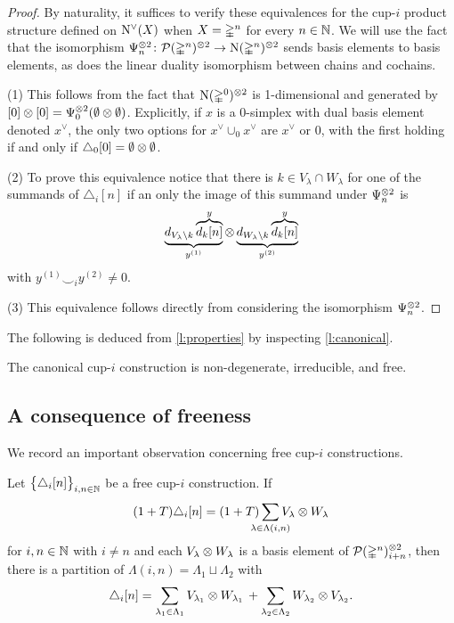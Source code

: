\begin{proof}
	By naturality, it suffices to verify these equivalences for the \mbox{cup-$i$} product structure defined on $\operatorname{N^{\vee}}(X)$ when $X = \mathbb{\Delta}^n$ for every $n \in \mathbb{N}$.
	We will use the fact that the isomorphism $\Psi_n^{\otimes 2} \colon \mathcal{P}(\mathbb{\Delta}^n)^{\otimes 2} \to \operatorname{N}(\mathbb{\Delta}^n)^{\otimes 2}$ sends basis elements to basis elements, as does the linear duality isomorphism between chains and cochains.

	\noindent (1) This follows from the fact that $\operatorname{N}(\mathbb{\Delta}^0)^{\otimes 2}$ is 1-dimensional and generated by $[0] \otimes [0] = \Psi_0^{\otimes 2} (\emptyset \otimes \emptyset)$.
	Explicitly, if $x$ is a $0$-simplex with dual basis element denoted $x^\vee$, the only two options for $x^\vee \cup_0 x^\vee$ are $x^\vee$ or $0$, with the first holding if and only if $\triangle_0[0] = \emptyset \otimes \emptyset$.

	\noindent (2) To prove this equivalence notice that there is $k \in V_\lambda \cap W_\lambda$ for one of the summands of $\triangle_i [n]$ if an only the image of this summand under $\Psi_n^{\otimes 2}$ is
	\[
	\underbrace{d_{V_\lambda \setminus k} \overbrace{d_k[n]}^{y}}_{y^{(1)}}
	\otimes
	\underbrace{d_{W_\lambda \setminus k} \overbrace{d_k[n]}^{y}}_{y^{(2)}}
	\]
	with $y^{(1)} \smallsmile_i y^{(2)} \neq 0$.

	\noindent (3) This equivalence follows directly from considering the isomorphism $\Psi_n^{\otimes 2}$.
\end{proof}

The following is deduced from \cref{l:properties} by inspecting \cref{l:canonical}.

\begin{theorem}\label{t:existence}
	The canonical \mbox{cup-$i$} construction is non-degenerate, irreducible, and free.
\end{theorem}

\subsection{A consequence of freeness}\label{ss:consequence}

We record an important observation concerning free cup-$i$ constructions.

\begin{lemma}\label{l:consequence}
	Let $\big\{ \triangle_i [n] \big\}_{i,n\in\mathbb{N}}$ be a free \mbox{cup-$i$} construction.
	If
	\[
	(1+T) \triangle_i [n] =
	(1+T) \sum_{\mathclap{\lambda \in \Lambda(i,n)}} V_\lambda \ot W_\lambda
	\]
	for $i,n \in \mathbb{N}$ with $i \neq n$ and each $V_\lambda \otimes W_\lambda$ is a basis element of $\mathcal{P}(\mathbb{\Delta}^n)^{\otimes 2}_{i+n}$, then there is a partition of $\Lambda(i,n) = \Lambda_1 \sqcup \Lambda_2$ with
	\begin{equation}\label{e:splitting}
	\triangle_i [n] =
	\sum_{\lambda_1 \in \Lambda_1} V_{\lambda_1} \otimes W_{\lambda_1} \, +
	\sum_{\lambda_2 \in \Lambda_2} W_{\lambda_2} \otimes V_{\lambda_2}.
	\end{equation}
\end{lemma}

